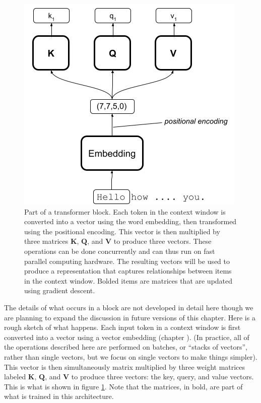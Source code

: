 \begin{figure}[h]
\centering
\includegraphics[scale=.4]{./images/transformerBlockBasic.png}
\caption[Jeff Yoshimi with consultation from Tim Meyer.]{Part of a transformer block. Each token in the context window is converted into a vector using the word embedding, then transformed using the positional encoding. This vector is then multiplied by three matrices $\textbf{K}$, $\textbf{Q}$, and $\textbf{V}$ to produce three vectors. These operations can be done concurrently and can thus run on fast parallel computing hardware. The resulting vectors will be used to produce a representation that captures relationships between items in the context window. Bolded items are matrices that are updated using gradient descent.}
\label{transformerBlockSimple}
\end{figure}

The details of what occurs in a block are not developed in detail here though we are planning to expand the discussion in future versions of this chapter. Here is a rough sketch of what happens. Each input token in a context window is first converted into a vector using a vector embedding (chapter ). (In practice, all of the operations described here are performed on batches, or ``stacks of vectors'', rather than single vectors, but we focus on single vectors to make things simpler). This vector is then simultaneously matrix multiplied by three weight matrices labeled $\textbf{K}$, $\textbf{Q}$, and $\textbf{V}$ to produce three vectors: the key, query, and value vectors. This is what is shown in figure \ref{transformerBlockSimple}. Note that the matrices, in bold, are part of what is trained in this architecture.

